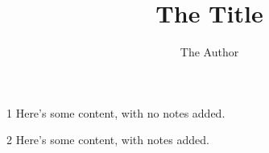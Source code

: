\documentclass[handout]{beamer}
\title{The Title}
\author{The Author}
\begin{document}
\begin{frame}
1 Here's some content, with no notes added.
\end{frame}
\begin{frame}
2 Here's some content, with notes added.
\end{frame}
\end{document}
